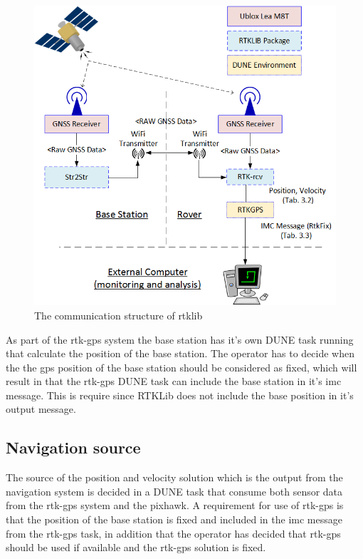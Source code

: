 \begin{figure}[H]
	\centering
		\includegraphics[width=1\textwidth]{figs/RTKLIB.png}
		\caption{The communication structure of \gls{rtklib}}
		\label{figure:RTKLIB_STRUCTURE}
\end{figure}
As part of the \gls{rtk-gps} system the base station has it's own DUNE task running that calculate the position of the base station. The operator has to decide when the the \gls{gps} position of the base station should be considered as fixed, which will result in that the \gls{rtk-gps} DUNE task can include the base station in it's \gls{imc} message. This is require since RTKLib does not include the base position in it's output message. 
\subsection{Navigation source}
The source of the position and velocity solution which is the output from the navigation system is decided in a DUNE task that consume both sensor data from the \gls{rtk-gps} system and the pixhawk. A requirement for use of \gls{rtk-gps} is that the position of the base station is fixed and included in the \gls{imc} message from the \gls{rtk-gps} task, in addition that the operator has decided that \gls{rtk-gps} should be used if available and the \gls{rtk-gps} solution is fixed.

